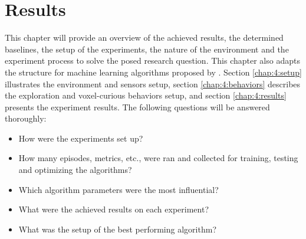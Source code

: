 
\chapter{Results}\label{chap:4}


    
This chapter will provide an overview of the achieved results, the determined baselines, the setup of the experiments, the nature of the environment and the experiment process to solve the posed research question. 
This chapter also adapts the structure for machine learning algorithms proposed by \textcite{luckert2016using}.
Section \ref{chap:4:setup} illustrates the environment and sensors setup, 
section \ref{chap:4:behaviors} describes the exploration and voxel-curious behaviors setup, 
and section \ref{chap:4:results} presents the experiment results. The following questions will be answered thoroughly:
\begin{itemize}
    \item How were the experiments set up?
    \item How many episodes, metrics, etc., were ran and collected for training, testing and optimizing the algorithms?
    \item Which algorithm parameters were the most influential?
    \item What were the achieved results on each experiment?
    \item What was the setup of the best performing algorithm?
\end{itemize}

